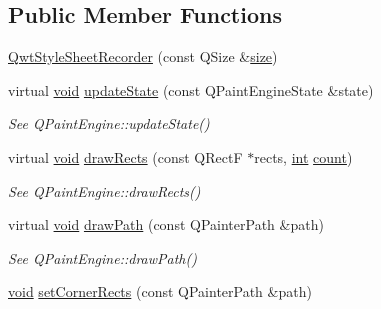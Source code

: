 \subsection*{Public Member Functions}
\begin{DoxyCompactItemize}
\item 
\hyperlink{class_qwt_style_sheet_recorder_a09d8643914c8f85b4db4e9f73b0d708f}{Qwt\-Style\-Sheet\-Recorder} (const Q\-Size \&\hyperlink{glext_8h_a014d89bd76f74ef3a29c8f04b473eb76}{size})
\item 
virtual \hyperlink{group___u_a_v_objects_plugin_ga444cf2ff3f0ecbe028adce838d373f5c}{void} \hyperlink{class_qwt_style_sheet_recorder_ad72307821ce9c2659ef5ecc8b2a568fb}{update\-State} (const Q\-Paint\-Engine\-State \&state)
\begin{DoxyCompactList}\small\item\em See Q\-Paint\-Engine\-::update\-State() \end{DoxyCompactList}\item 
virtual \hyperlink{group___u_a_v_objects_plugin_ga444cf2ff3f0ecbe028adce838d373f5c}{void} \hyperlink{class_qwt_style_sheet_recorder_a309f064f30e69083fe6b63d581daa2db}{draw\-Rects} (const Q\-Rect\-F $\ast$rects, \hyperlink{ioapi_8h_a787fa3cf048117ba7123753c1e74fcd6}{int} \hyperlink{glext_8h_a5b40aca7a9682963dd00a8f5aef0a901}{count})
\begin{DoxyCompactList}\small\item\em See Q\-Paint\-Engine\-::draw\-Rects() \end{DoxyCompactList}\item 
virtual \hyperlink{group___u_a_v_objects_plugin_ga444cf2ff3f0ecbe028adce838d373f5c}{void} \hyperlink{class_qwt_style_sheet_recorder_a80e99aa0e55691cf9c70db3ec4b2dfc0}{draw\-Path} (const Q\-Painter\-Path \&path)
\begin{DoxyCompactList}\small\item\em See Q\-Paint\-Engine\-::draw\-Path() \end{DoxyCompactList}\item 
\hyperlink{group___u_a_v_objects_plugin_ga444cf2ff3f0ecbe028adce838d373f5c}{void} \hyperlink{class_qwt_style_sheet_recorder_a18c1b8e10f3360e84acae3fe183ac765}{set\-Corner\-Rects} (const Q\-Painter\-Path \&path)
\end{DoxyCompactItemize}
